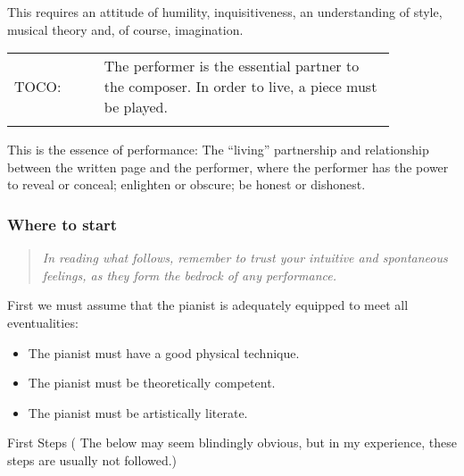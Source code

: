 \documentclass{article}
\begin{document}
This requires an attitude of humility, inquisitiveness, an understanding of style, musical theory and, of course, imagination.

\begin{tabular}{p{0.2\linewidth}p{0.65\linewidth}}
    \\
    TOCO: & The performer is the essential partner to the composer.
    In order to live, a piece must be played.\\
    \\
\end{tabular}

This is the essence of performance: The ``living'' partnership and relationship between the written page and the performer, where the performer has the power to reveal or conceal; enlighten or obscure; be honest or dishonest.

\subsubsection{Where to start}

\begin{quote}
    \textit{In reading what follows, remember to trust your intuitive and spontaneous feelings, as they form the bedrock of any performance.}
\end{quote}

First we must assume that the pianist is adequately equipped to meet all eventualities:

\begin{itemize}
    \item The pianist must have a good physical technique.\footnotemark
    \item The pianist must be theoretically competent.
    \item The pianist must be artistically literate.
\end{itemize}


First Steps ( The below may seem blindingly obvious, but in my experience, these steps are usually not followed.)
\end{document}
